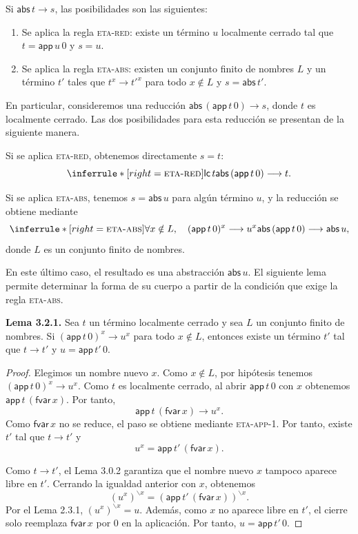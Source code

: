 \documentclass[
  spanish,
  letterpaper,
  DIV=11,
  numbers=noendperiod]{scrreprt}
\theoremstyle{remark}
\begin{document}
Si \(\mathsf{abs}\,t\longrightarrow s\), las posibilidades son las
siguientes:

\begin{enumerate}
\def\labelenumi{\arabic{enumi}.}
\item
  Se aplica la regla \textsc{eta-red}: existe un término \(u\)
  localmente cerrado tal que \(t=\mathsf{app}\,u\,0\) y \(s=u\).
\item
  Se aplica la regla \textsc{eta-abs}: existen un conjunto finito de
  nombres \(L\) y un término \(t'\) tales que
  \(t^x\longrightarrow t'^x\) para todo \(x\notin L\) y
  \(s=\mathsf{abs}\,t'\).
\end{enumerate}

En particular, consideremos una reducción
\(\mathsf{abs}\,(\mathsf{app}\,t\,0)\longrightarrow s\), donde \(t\) es
localmente cerrado. Las dos posibilidades para esta reducción se
presentan de la siguiente manera.

Si se aplica \textsc{eta-red}, obtenemos directamente \(s=t\): \[
\inferrule*[right=\textsc{eta-red}]
  {\mathsf{lc}\,t}
  {\mathsf{abs}\,(\mathsf{app}\,t\,0)\longrightarrow t}.
\]

Si se aplica \textsc{eta-abs}, tenemos \(s=\mathsf{abs}\,u\) para algún
término \(u\), y la reducción se obtiene mediante \[
\inferrule*[right=\textsc{eta-abs}]
  {\forall x\notin L,\quad
   (\mathsf{app}\,t\,0)^x\longrightarrow u^x}
  {\mathsf{abs}\,(\mathsf{app}\,t\,0)
   \longrightarrow\mathsf{abs}\,u},
\] donde \(L\) es un conjunto finito de nombres.

En este último caso, el resultado es una abstracción
\(\mathsf{abs}\,u\). El siguiente lema permite determinar la forma de su
cuerpo a partir de la condición que exige la regla \textsc{eta-abs}.

\textbf{Lema 3.2.1.} Sea \(t\) un término localmente cerrado y sea \(L\)
un conjunto finito de nombres. Si
\((\mathsf{app}\,t\,0)^x\longrightarrow u^x\) para todo \(x\notin L\),
entonces existe un término \(t'\) tal que \(t\longrightarrow t'\) y
\(u=\mathsf{app}\,t'\,0\).

\begin{proof}
Elegimos un nombre nuevo \(x\). Como \(x\notin L\), por hipótesis
tenemos \((\mathsf{app}\,t\,0)^x\longrightarrow u^x\). Como \(t\) es
localmente cerrado, al abrir \(\mathsf{app}\,t\,0\) con \(x\) obtenemos
\(\mathsf{app}\,t\,(\mathsf{fvar}\,x)\). Por tanto, \[
\mathsf{app}\,t\,(\mathsf{fvar}\,x)\longrightarrow u^x.
\] Como \(\mathsf{fvar}\,x\) no se reduce, el paso se obtiene mediante
\textsc{eta-app-1}. Por tanto, existe \(t'\) tal que
\(t\longrightarrow t'\) y \[
u^x=\mathsf{app}\,t'\,(\mathsf{fvar}\,x).
\]

Como \(t\longrightarrow t'\), el Lema 3.0.2 garantiza que el nombre
nuevo \(x\) tampoco aparece libre en \(t'\). Cerrando la igualdad
anterior con \(x\), obtenemos \[
(u^x)^{\backslash x}
=
(\mathsf{app}\,t'\,(\mathsf{fvar}\,x))^{\backslash x}.
\] Por el Lema 2.3.1, \((u^x)^{\backslash x}=u\). Además, como \(x\) no
aparece libre en \(t'\), el cierre solo reemplaza \(\mathsf{fvar}\,x\)
por \(0\) en la aplicación. Por tanto, \(u=\mathsf{app}\,t'\,0\).
\end{proof}
\end{document}
